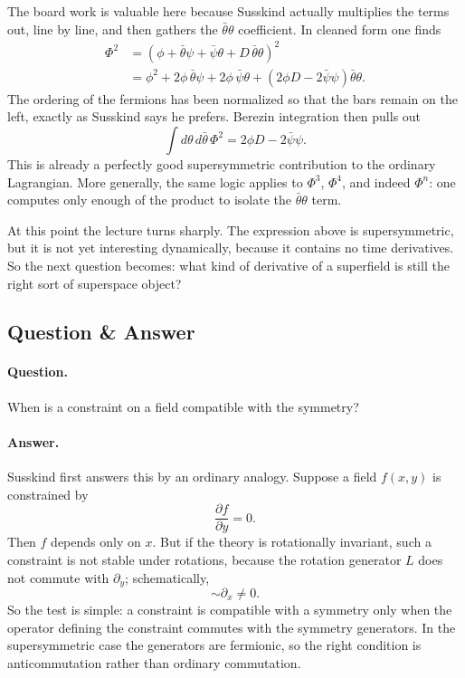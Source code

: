 The board work is valuable here because Susskind actually multiplies the terms out, line by line, and then gathers the \(\bar\theta\theta\) coefficient. In cleaned form one finds
\begin{align}
\Phi^2
&=
\left(\phi+\bar\theta\psi+\bar\psi\theta+D\,\bar\theta\theta\right)^2
\\
&=
\phi^2
+2\phi\,\bar\theta\psi
+2\phi\,\bar\psi\theta
+\left(2\phi D-2\bar\psi\psi\right)\bar\theta\theta.
\end{align}
The ordering of the fermions has been normalized so that the bars remain on the left, exactly as Susskind says he prefers. Berezin integration then pulls out
\begin{equation}
\int d\theta\,d\bar\theta\,\Phi^2
=
2\phi D-2\bar\psi\psi.
\end{equation}
This is already a perfectly good supersymmetric contribution to the ordinary Lagrangian. More generally, the same logic applies to \(\Phi^3\), \(\Phi^4\), and indeed \(\Phi^n\): one computes only enough of the product to isolate the \(\bar\theta\theta\) term.

At this point the lecture turns sharply. The expression above is supersymmetric, but it is not yet interesting dynamically, because it contains no time derivatives. So the next question becomes: what kind of derivative of a superfield is still the right sort of superspace object?

\subsection{Question \& Answer}

\paragraph{Question.} When is a constraint on a field compatible with the symmetry?

\paragraph{Answer.} Susskind first answers this by an ordinary analogy. Suppose a field \(f(x,y)\) is constrained by
\begin{equation}
\frac{\partial f}{\partial y}=0.
\end{equation}
Then \(f\) depends only on \(x\). But if the theory is rotationally invariant, such a constraint is not stable under rotations, because the rotation generator \(L\) does not commute with \(\partial_y\); schematically,
\begin{equation}
[\partial_y,L]\sim \partial_x\neq 0.
\end{equation}
So the test is simple: a constraint is compatible with a symmetry only when the operator defining the constraint commutes with the symmetry generators. In the supersymmetric case the generators are fermionic, so the right condition is anticommutation rather than ordinary commutation.

